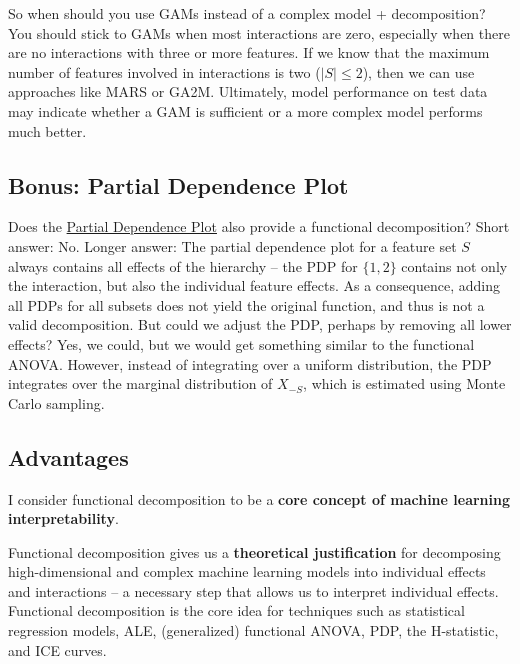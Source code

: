 \documentclass[
  10pt,
]{scrbook}
\begin{document}
So when should you use GAMs instead of a complex model + decomposition?
You should stick to GAMs when most interactions are zero, especially when there are no interactions with three or more features.
If we know that the maximum number of features involved in interactions is two (\(|S|\leq{}2\)), then we can use approaches like MARS or GA2M.
Ultimately, model performance on test data may indicate whether a GAM is sufficient or a more complex model performs much better.

\hypertarget{bonus-partial-dependence-plot}{%
\subsection{Bonus: Partial Dependence Plot}\label{bonus-partial-dependence-plot}}

Does the \protect\hyperlink{pdp}{Partial Dependence Plot} also provide a functional decomposition?
Short answer: No.
Longer answer:
The partial dependence plot for a feature set \(S\) always contains all effects of the hierarchy -- the PDP for \(\{1,2\}\) contains not only the interaction, but also the individual feature effects.
As a consequence, adding all PDPs for all subsets does not yield the original function, and thus is not a valid decomposition.
But could we adjust the PDP, perhaps by removing all lower effects?
Yes, we could, but we would get something similar to the functional ANOVA.
However, instead of integrating over a uniform distribution, the PDP integrates over the marginal distribution of \(X_{-S}\), which is estimated using Monte Carlo sampling.

\hypertarget{advantages-8}{%
\subsection{Advantages}\label{advantages-8}}

I consider functional decomposition to be a \textbf{core concept of machine learning interpretability}.

Functional decomposition gives us a \textbf{theoretical justification} for decomposing high-dimensional and complex machine learning models into individual effects and interactions -- a necessary step that allows us to interpret individual effects.
Functional decomposition is the core idea for techniques such as statistical regression models, ALE, (generalized) functional ANOVA, PDP, the H-statistic, and ICE curves.
\end{document}
